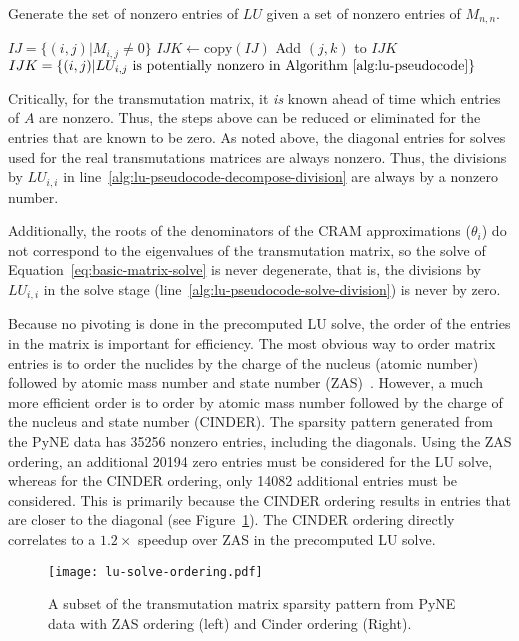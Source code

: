 \begin{algorithm}[h]
  \caption{Generate the set of nonzero entries of $LU$ given a set of nonzero
    entries of $M_{n,n}$.}\label{alg:make-ijk}
  \begin{algorithmic}[1]
  \REQUIRE $IJ=\{(i, j) | M_{i, j} \neq 0\}$
  \STATE $IJK \leftarrow \mathrm{copy}(IJ)$
  \STATE
              \CONTINUE
          \ENDIF
          \STATE
                   \STATE Add $(j, k)$ to $IJK$
               \ENDIF
          \ENDFOR
      \ENDFOR
  \ENDFOR
  \ENSURE $IJK=\{(i,j)|LU_{i,j}\mathrm{\ is\ potentially\ nonzero\ in\ Algorithm~\ref{alg:lu-pseudocode}}\}$
\end{algorithmic}
\end{algorithm}

Critically, for the transmutation matrix, it \textit{is} known ahead of time
which entries of $A$ are nonzero. Thus, the steps above can be reduced or
eliminated for the entries that are known to be zero. As noted above, the
diagonal entries for solves used for the real transmutations matrices are
always nonzero. Thus, the divisions by $LU_{i,i}$ in
line~\ref{alg:lu-pseudocode-decompose-division} are always by a nonzero
number.

Additionally, the roots of the denominators of the CRAM approximations
($\theta_i$) do not correspond to the eigenvalues of the transmutation matrix,
so the solve of Equation~\ref{eq:basic-matrix-solve} is never degenerate, that
is, the divisions by $LU_{i,i}$ in the solve stage
(line~\ref{alg:lu-pseudocode-solve-division}) is never by zero.

Because no pivoting is done in the precomputed LU solve, the order of the
entries in the matrix is important for efficiency. The most obvious way to
order matrix entries is to order the nuclides by the charge of the nucleus
(atomic number) followed by atomic mass number and state number
(ZAS)~\cite{ationneeded}. However, a much more efficient order is to order by
atomic mass number followed by the charge of the nucleus and state number
(CINDER). The sparsity pattern generated from the PyNE data has 35256 nonzero
entries, including the diagonals. Using the ZAS ordering, an additional 20194
zero entries must be considered for the LU solve, whereas for the CINDER
ordering, only 14082 additional entries must be considered. This is primarily
because the CINDER ordering results in entries that are closer to the diagonal
(see Figure~\ref{fig:lu-solve-ordering}). The CINDER ordering directly
correlates to a $1.2\times$ speedup over ZAS in the precomputed LU solve.

\begin{figure}[!ht]
\centering
\texttt{[image: lu-solve-ordering.pdf]}
\caption{A subset of the transmutation matrix sparsity pattern from PyNE data
  with ZAS ordering (left) and Cinder ordering (Right).}
\label{fig:lu-solve-ordering}
\end{figure}
